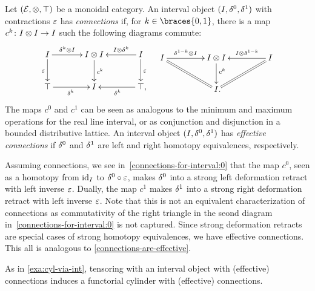 \documentclass[reqno,10pt,a4paper,oneside,draft]{amsart}
\begin{document}
\begin{example} \label{exa:connections-for-interval}
Let $(\mathcal{E}, \otimes, \top)$ be a monoidal category.
An interval object $(I, \delta^0, \delta^1)$ with contractions $\varepsilon$ has \emph{connections} if, for $k \in \braces{0, 1}$, there is a map $c^k \colon I \otimes I \to I$ such the following diagrams commute:
\begin{align} \label{connections-for-interval:0}
\begin{aligned}
\xymatrix@C+1em{
  \interval
  \ar[r]^-{\kcyl \otimes \interval}
  \ar[d]_{\ccyl}
&
  \interval \otimes \interval
  \ar[d]^{c^k}
&
  \interval
  \ar[l]_-{\interval \otimes \kcyl}
  \ar[d]^{\ccyl}
\\
  \top
  \ar[r]_{\kcyl}
&
  \interval
&
  \top
  \ar[l]^{\kcyl}
\rlap{,}}
\end{aligned}
&&
\begin{aligned}
\xymatrix@C+2em{
  \interval
  \ar[r]^-{\kcylinv \otimes \interval}
  \ar@{=}[dr]
&
  \interval \otimes \interval
  \ar[d]^(0.4){c^k}
&
  \interval
  \ar[l]_-{\interval \otimes \kcylinv}
  \ar@{=}[dl]
\\&
  \interval
\rlap{.}}
\end{aligned}
\end{align}
The maps $c^0$ and $c^1$ can be seen as analogous to the minimum and maximum operations for the real line interval, or as conjunction and disjunction in a bounded distributive lattice.
An interval object $(I, \delta^0, \delta^1)$ has \emph{effective connections} if $\delta^0$ and $\delta^1$ are left and right homotopy equivalences, respectively.

Assuming connections, we see in~\eqref{connections-for-interval:0} that the map $c^0$, seen as a homotopy from $\operatorname{id}_I$ to $\delta^0 \mathbin{\circ} \varepsilon$, makes $\delta^0$ into a strong left deformation retract with left inverse $\varepsilon$.
Dually, the map $c^1$ makes $\delta^1$ into a strong right deformation retract with left inverse $\varepsilon$.
Note that this is not an equivalent characterization of connections as commutativity of the right triangle in the seond diagram in~\eqref{connections-for-interval:0} is not captured.
Since strong deformation retracts are special cases of strong homotopy equivalences, we have effective connections.
This all is analogous to \cref{connections-are-effective}.

As in \cref{exa:cyl-via-int}, tensoring with an interval object with (effective) connections induces a functorial cylinder with (effective) connections.
\end{example}
\end{document}
